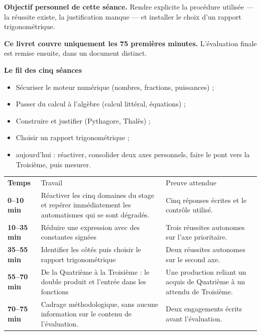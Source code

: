 \documentclass[10pt,a4paper]{article}
\begin{document}
\begin{goalbox}
\textbf{Objectif personnel de cette séance.} Rendre explicite la procédure utilisée — la réussite existe, la justification manque — et installer le choix d'un rapport trigonométrique.
\par\medskip
\textbf{Ce livret couvre uniquement les 75 premières minutes.} L'évaluation finale est remise ensuite, dans un document distinct.
\end{goalbox}
\begin{methodbox}
\textbf{Le fil des cinq séances}
\begin{itemize}[leftmargin=13mm,labelsep=3mm,itemsep=1.5pt]
\item[\textbf{\color{Navy}S1}] Sécuriser le moteur numérique (nombres, fractions, puissances) ;
\item[\textbf{\color{Navy}S2}] Passer du calcul à l'algèbre (calcul littéral, équations) ;
\item[\textbf{\color{Navy}S3}] Construire et justifier (Pythagore, Thalès) ;
\item[\textbf{\color{Navy}S4}] Choisir un rapport trigonométrique ;
\item[\textbf{\color{Navy}S5}] aujourd'hui : réactiver, consolider deux axes personnels, faire le pont vers la Troisième, puis mesurer.
\end{itemize}
\end{methodbox}
\par\noindent\begin{tabularx}{\linewidth}{>{\bfseries}p{20mm} X X}
\rowcolor{Navy}\color{white}Temps & \color{white}Travail & \color{white}Preuve attendue \\
0--10 min & Réactiver les cinq domaines du stage et repérer immédiatement les automatismes qui se sont dégradés. & Cinq réponses écrites et le contrôle utilisé. \\
10--35 min & Réduire une expression avec des constantes signées & Trois réussites autonomes sur l'axe prioritaire. \\
35--55 min & Identifier les côtés puis choisir le rapport trigonométrique & Deux réussites autonomes sur le second axe. \\
55--70 min & De la Quatrième à la Troisième : le double produit et l'entrée dans les fonctions & Une production reliant un acquis de Quatrième à un attendu de Troisième. \\
70--75 min & Cadrage méthodologique, sans aucune information sur le contenu de l'évaluation. & Deux engagements écrits avant l'évaluation. \\
\end{tabularx}
\end{document}

